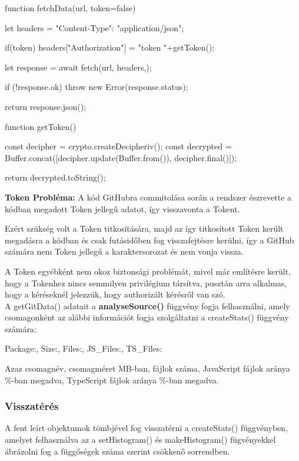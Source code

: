 \begin{js}
function fetchData(url, token=false){
	let headers = {"Content-Type": "application/json"};
	
	if(token){
		headers["Authorization"] = "token "+getToken();
	}
	
	let response = await fetch(url, {headers,});
	
	if (!response.ok) {
		throw new Error(response.status);
	}
	
	return response.json();
}

function getToken(){
	const decipher = crypto.createDecipheriv();
	const decrypted = Buffer.concat([decipher.update(Buffer.from()),
						decipher.final()]);
	
	return decrypted.toString();
}
\end{js}
\textbf{Token Probléma:} A kód GitHubra commitolása során a rendszer észrevette a kódban megadott Token jellegű adatot, így visszavonta a Tokent. 

Ezért szükség volt a Token titkosítására, majd az így titkosított Token került megadásra a kódban és csak futásidőben fog visszafejtésre kerülni, így a GitHub számára nem Token jellegű a karaktersorozat és nem vonja vissza.

A Token egyébként nem okoz biztonsági problémát, mivel már említésre került, hogy a Tokenhez nincs semmilyen privilégium társítva, pusztán arra alkalmas, hogy a kéréseknél jelezzük, hogy authorizált kérésről van szó.\\

A getGitData() adatait a \textbf{analyseSource()} függvény fogja felhasználni, amely csomagonként az alábbi információt fogja szolgáltatni a createStats() függvény számára:

\begin{js}
	{Package:, Size:, Files:, JS_Files:, TS_Files:}
\end{js}
Azaz csomagnév, csomagméret MB-ban, fájlok száma, JavaScript fájlok aránya \%-ban megadva, TypeScript fájlok aránya \%-ban megadva.

\subsubsection{Visszatérés}

A fent leírt objektumok tömbjével fog visszatérni a createStats() függvényben, amelyet felhasználva az a setHistogram() és makeHistogram() fügvényekkel ábrázolni fog a függőségek száma szerint csökkenő sorrendben.

